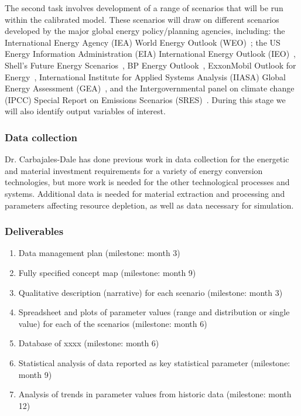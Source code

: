 \documentclass[11pt,a4paper]{article}
\begin{document}
The second task involves 
development of a range of scenarios 
that will be run within the calibrated model. 
These scenarios will draw on different scenarios 
developed by the major 
global energy policy/planning agencies, including: 
the International Energy Agency (IEA) World Energy Outlook (WEO)~\cite{IEA20xx}; 
the US Energy Information Administration (EIA) International Energy Outlook (IEO)~\cite{EIA20xx}, 
Shell's Future Energy Scenarios~\cite{Shell20xx}, 
BP Energy Outlook~\cite{BP20xx}, 
ExxonMobil Outlook for Energy~\cite{Exxon20xx}, 
International Institute for Applied Systems Analysis (IIASA) Global Energy Assessment (GEA)~\cite{IIASA2012}, and 
the Intergovernmental panel on climate change (IPCC)
Special Report on Emissions Scenarios (SRES)~\cite{IPCC2000}. 
During this stage we will also identify output variables of interest.

\subsubsection{Data collection}

Dr. Carbajales-Dale has done previous work in 
data collection for the energetic and material investment requirements 
for a variety of energy conversion technologies, 
but more work is needed for the other 
technological processes and systems. 
Additional data is needed for material extraction and processing
and parameters affecting resource depletion,
as well as data necessary for simulation.




\subsubsection{Deliverables}
\begin{enumerate}
\vspace{-9pt}
\setlength{\itemsep}{-3pt}
	\item	Data management plan (milestone: month 3)
	\item	Fully specified concept map (milestone: month 9)
	\item	Qualitative description (narrative) for each scenario (milestone: month 3)
	\item	Spreadsheet and plots of parameter values 
				(range and distribution or single value) 
				for each of the scenarios (milestone: month 6)
	\item	Database of xxxx (milestone: month 6)
	\item	Statistical analysis of data reported as key statistical parameter (milestone: month 9)
	\item	Analysis of trends in parameter values from historic data (milestone: month 12)
\end{enumerate}
\end{document}
